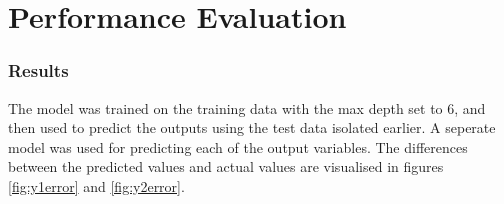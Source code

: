 \documentclass[12pt]{article}
\begin{document}
\FloatBarrier

\part{Performance Evaluation}

\section{Results}

The model was trained on the training data with the max depth set to 6, and then used to predict the outputs using the test data isolated earlier. A seperate model was used for predicting each of the output variables. The differences between the predicted values and actual values are visualised in figures \ref{fig:y1error} and \ref{fig:y2error}.
\end{document}
